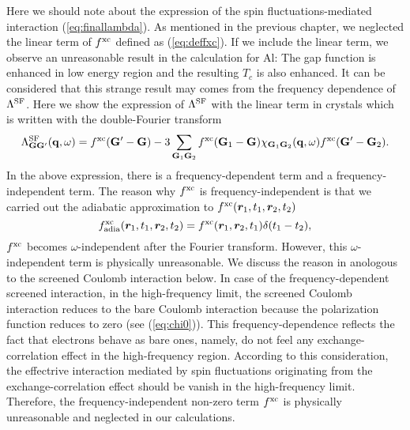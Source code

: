 Here we should note about the expression of the spin fluctuations-mediated interaction (\ref{eq:finallambda}).
As mentioned in the previous chapter, we neglected the linear term of $f^{\rm xc}$ defined as 
(\ref{eq:deffxc}). If we include the linear term, we observe an unreasonable result in the
calculation for Al: The gap function is enhanced in low energy region and the resulting $T_c$
is also enhanced. It can be considered that this strange result may comes from the frequency
dependence of $\Lambda^{\rm SF}$. Here we show the expression of $\Lambda^{\rm SF}$ with the linear term in crystals 
which is written with the double-Fourier transform\cite{Hybertsen1987}
%
\begin{equation}
	\Lambda^{\rm SF}_{\mathbf G \mathbf G'}(\mathbf q, \omega) = f^{\rm xc}(\mathbf G' - \mathbf G) - 
	3\sum_{\mathbf G_1 \mathbf G_2} f^{\rm xc}(\mathbf G_1 - \mathbf G)\chi_{\mathbf G_1 \mathbf G_2}(\mathbf q, \omega)
	f^{\rm xc}(\mathbf G' - \mathbf G_2).
	\label{eq:lambdamiss}
\end{equation}
%
In the above expression, there is a frequency-dependent term and a frequency-independent term.
The reason why $f^{\rm xc}$ is frequency-independent is that we carried out 
the adiabatic approximation to $f^{\rm xc}(\bm r_1,t_1, \bm r_2,t_2)$
%
\begin{equation}
	f^{\rm xc}_{\rm adia}(\bm r_1,t_1, \bm r_2, t_2) = f^{\rm xc}(\bm r_1,\bm r_2, t_1)\delta(t_1 - t_2),
	\label{eq:adiabatic}
\end{equation}
%
$f^{\rm xc}$ becomes $\omega$-independent after the Fourier transform.
However, this $\omega$-independent term is physically unreasonable. 
We discuss the reason in anologous to the screened Coulomb interaction below.
In case of the frequency-dependent screened interaction, in the high-frequency limit, 
the screened Coulomb interaction reduces to the bare Coulomb interaction because
the polarization function reduces to zero (see (\ref{eq:chi0})).
This frequency-dependence reflects the fact that electrons behave as bare ones, namely, 
do not feel any exchange-correlation effect in the high-frequency region.
According to this consideration, the effectrive interaction mediated by spin fluctuations originating
from the exchange-correlation effect should be vanish in the high-frequency limit.
Therefore, the frequency-independent non-zero term $f^{\rm xc}$ is physically unreasonable and 
neglected in our calculations.

